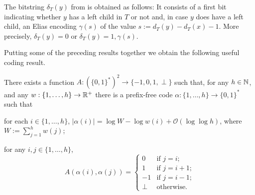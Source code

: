 \documentclass[kpfonts]{patmorin}
\newcommand{\Oh}{\mathcal{O}}
\begin{document}
The bitstring $\delta_T(y)$ from  is obtained as follows: It consists of a first bit indicating whether $y$ has a left child in $T$ or not and, in case $y$ does have a left child, an Elias encoding $\gamma(s)$ of the value $s:=d_T(y)-d_T(x)-1$.  More precisely, $\delta_T(y)=0$ or $\delta_T(y)=1,\gamma(s)$.

Putting some of the preceding results together we obtain the following useful coding result.

\begin{lem}
  There exists a function $A:(\{0,1\}^*)^2\to\{-1,0,1,\perp\}$ such that, for any $h\in\mathbb{N}$, and any $w:\{1,\ldots,h\}\to\mathbb{R}^+$ there is a prefix-free code $\alpha:\{1,\ldots,h\}\to \{0,1\}^*$ such that
  \begin{compactenum}
    \item for each $i\in\{1,\ldots,h\}$, $|\alpha(i)|=\log W -\log w(i) + \Oh(\log\log h)$, where $W:=\sum_{j=1}^h w(j)$;
    \item for any $i,j\in\{1,\ldots,h\}$,
    \[   A(\alpha(i),\alpha(j))
    = \begin{cases}
       0 & \text{if $j=i$;}\\
       1 & \text{if $j=i+1$;} \\
       -1 & \text{if $j=i-1$;} \\
       \perp & \text{otherwise.}
      \end{cases}
      \]
    \end{compactenum}
\end{lem}
\end{document}

